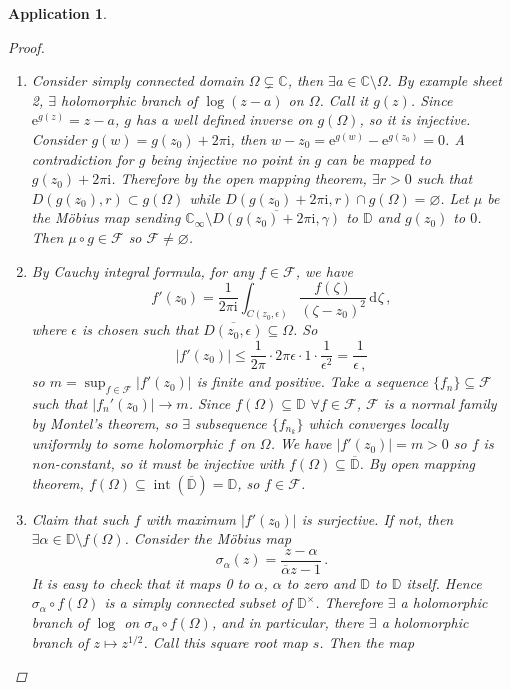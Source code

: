 \documentclass{article}
\theoremstyle{plain}\theoremheaderfont{\normalfont\itshape}\theorembodyfont{\rmfamily}\theoremseparator{.}\newtheorem*{rem}{Remark}\newtheorem*{ex}{Example}\newtheorem*{proof}{Proof}\newtheorem*{altp}{Alternative proof}\newtheorem*{con}{Consequences}\newtheorem*{notn}{Notations}\newtheorem*{cau}{Caution}\newtheorem*{term}{Terminology}\newtheorem*{keyex}{Key example}
\theoremstyle{plain}\theoremheaderfont{\normalfont\bfseries}\theorembodyfont{\rmfamily}\theoremseparator{.}\newtheorem{thm}{Theorem}[section]\newtheorem{lem}[thm]{Lemma}\newtheorem{prop}[thm]{Proposition}\newtheorem*{cor}{Corollary}\newtheorem{defn}[thm]{Definition}\newtheorem{clm}[thm]{Claim}\newtheorem{clminproof}{Claim}\newtheorem{leminproof}{Lemma}\newtheorem{app}{Application}
\theoremstyle{break}\theoremheaderfont{\normalfont\itshape}\theorembodyfont{\rmfamily}\theoremseparator{.\medskip}\newtheorem*{proofskip}{Proof}\newtheorem*{exs}{Examples}\newtheorem*{rems}{Remarks}\newtheorem*{rec}{Recall}\newtheorem*{ppts}{Properties}
\theoremstyle{break}\theoremheaderfont{\normalfont\bfseries}\theorembodyfont{\rmfamily}\theoremseparator{.\medskip}\newtheorem{lemskip}[thm]{Lemma}\newtheorem{defnskip}[thm]{Definition}\newtheorem{propskip}[thm]{Proposition}\newtheorem{thmskip}[thm]{Theorem}
\numberwithin{equation}{section}
\newcommand{\ii}{\mathrm{i}}
\newcommand{\ee}{\mathrm{e}}
\DeclareMathOperator*{\inter}{int}
\newcommand{\abs}[1]{\left|#1\right|}
\newcommand{\dd}[2][]{\,\mathrm{d}^{#1} #2}
\newcommand{\CC}{\mathbb{C}}
\newcommand{\DD}{\mathbb{D}}
\begin{document}
\begin{app}
\begin{proof}
            \begin{enumerate}[topsep=0pt]
                \item Consider simply connected domain \(\Omega\subsetneq\CC\), then \(\exists a\in\CC\setminus\Omega\). By example sheet 2, \(\exists\) holomorphic branch of \(\log(z-a)\) on \(\Omega\). Call it \(g(z)\). Since \(\ee^{g(z)}=z-a\), \(g\) has a well defined inverse on \(g(\Omega)\), so it is injective. Consider \(g(w)=g(z_0)+2\pi \ii\), then \(w-z_0=\ee^{g(w)}-\ee^{g(z_0)}=0\). A contradiction for \(g\) being injective no point in \(g\) can be mapped to \(g(z_0)+2\pi \ii\). Therefore by the open mapping theorem, \(\exists r>0\) such that \(D(g(z_0),r)\subset g(\Omega)\) while \(D(g(z_0)+2\pi \ii,r)\cap g(\Omega)=\varnothing\). Let \(\mu\) be the M\"{o}bius map sending \(\CC_{\infty}\setminus\overline{D(g(z_0)+2\pi \ii,\gamma)}\) to \(\DD\) and \(g(z_0)\) to \(0\). Then \(\mu\circ g\in\mathcal{F}\) so \(\mathcal{F}\ne\varnothing\).
                \item By Cauchy integral formula, for any \(f\in\mathcal{F}\), we have
                \[f'(z_0)=\frac{1}{2\pi \ii}\int_{C(z_0,\epsilon)}\frac{f(\zeta)}{(\zeta-z_0)^2}\dd{\zeta}\,,\]
                where \(\epsilon\) is chosen such that \(\overline{D(z_0,\epsilon)}\subseteq\Omega\). So
                \[\abs{f'(z_0)}\le\frac{1}{2\pi}\cdot 2\pi\epsilon\cdot1\cdot\frac{1}{\epsilon^2}=\frac{1}{\epsilon\,,}\]
                so \(m=\sup_{f\in\mathcal{F}}\abs{f'(z_0)}\) is finite and positive. Take a sequence \(\{f_n\}\subseteq\mathcal{F}\) such that \(\abs{f_n'(z_0)}\to m\). Since \(f(\Omega)\subseteq\DD\) \(\forall f\in\mathcal{F}\), \(\mathcal{F}\) is a normal family by Montel's theorem, so \(\exists\) subsequence \(\{f_{n_k}\}\) which converges locally uniformly to some holomorphic \(f\) on \(\Omega\). We have \(\abs{f'(z_0)}=m>0\) so \(f\) is non-constant, so it must be injective with \(f(\Omega)\subseteq\overline{\DD}\). By open mapping theorem, \(f(\Omega)\subseteq\inter(\overline{\DD})=\DD\), so \(f\in\mathcal{F}\).
                \item Claim that such \(f\) with maximum \(\abs{f'(z_0)}\) is surjective. If not, then \(\exists \alpha\in\DD\setminus f(\Omega)\). Consider the M\"{o}bius map
                \[\sigma_{\alpha}(z)=\frac{z-\alpha}{\overline{\alpha}z-1}\,.\]
                It is easy to check that it maps 0 to \(\alpha\), \(\alpha\) to zero and \(\DD\) to \(\DD\) itself. Hence \(\sigma_\alpha\circ f(\Omega)\) is a simply connected subset of \(\DD^\times\). Therefore \(\exists\) a holomorphic branch of \(\log\) on \(\sigma_\alpha\circ f(\Omega)\), and in particular, there \(\exists\) a holomorphic branch of \(z\mapsto z^{1/2}\). Call this square root map \(s\). Then the map

\end{enumerate}
\end{proof}
\end{app}
\end{document}
